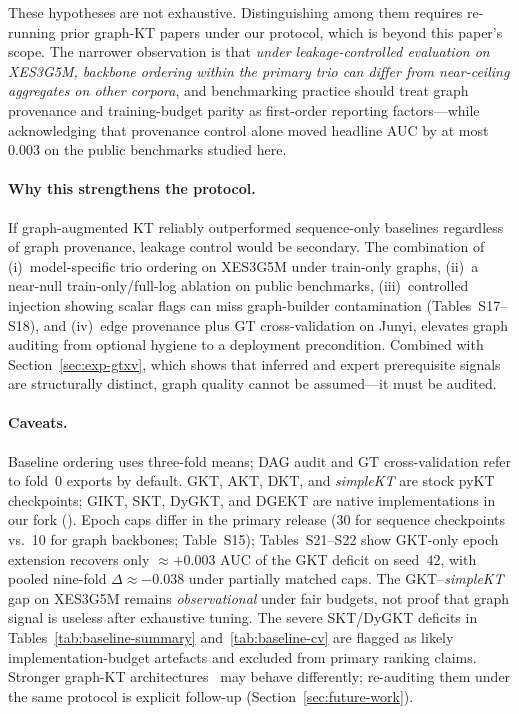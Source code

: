 \documentclass[pdflatex,sn-mathphys-num]{sn-jnl}
\newcommand{\GKTthirtydeltavec}{-0.038}
\newcommand{\GKTepochgain}{+0.003}
\begin{document}
These hypotheses are not exhaustive. Distinguishing among them requires
re-running prior graph-KT papers under our protocol, which is beyond this
paper's scope. The narrower observation is that \emph{under leakage-controlled
evaluation on XES3G5M, backbone ordering within the primary trio can differ
from near-ceiling aggregates on other corpora}, and benchmarking practice
should treat graph provenance and training-budget parity as first-order
reporting factors---while acknowledging that provenance control alone moved
headline AUC by at most $0.003$ on the public benchmarks studied here.

\paragraph{Why this strengthens the protocol.}
If graph-augmented KT reliably outperformed sequence-only baselines
regardless of graph provenance, leakage control would be secondary. The
combination of (i)~model-specific trio ordering on XES3G5M under train-only
graphs, (ii)~a near-null train-only/full-log ablation on public benchmarks,
(iii)~controlled injection showing scalar flags can miss graph-builder
contamination (Tables~S17--S18), and (iv)~edge provenance plus GT
cross-validation on Junyi, elevates graph auditing from optional hygiene to a
deployment precondition. Combined with Section~\ref{sec:exp-gtxv}, which shows
that inferred and expert prerequisite signals are structurally distinct, graph
quality cannot be assumed---it must be audited.

\paragraph{Caveats.}
Baseline ordering uses three-fold means; DAG audit and GT cross-validation
refer to fold~0 exports by default. GKT, AKT, DKT, and \textit{simpleKT} are
stock pyKT~\cite{liu2022pykt} checkpoints; GIKT, SKT, DyGKT, and DGEKT are
native implementations in our fork (). Epoch caps differ in
the primary release (30 for sequence checkpoints vs.\ 10 for graph backbones;
Table~S15); Tables~S21--S22 show GKT-only epoch extension recovers only
${\approx}\GKTepochgain{}$ AUC of the GKT deficit on seed~$42$, with pooled
nine-fold $\Delta{\approx}\GKTthirtydeltavec{}$ under partially matched caps.
The GKT--\textit{simpleKT} gap on XES3G5M remains \emph{observational} under
fair budgets, not proof that graph signal is useless after exhaustive tuning.
The severe SKT/DyGKT deficits in Tables~\ref{tab:baseline-summary}
and~\ref{tab:baseline-cv} are flagged as likely implementation-budget artefacts
and excluded from primary ranking claims. Stronger graph-KT architectures~\cite{tong2020skt,dygkt2024,dgekt2024}
may behave differently; re-auditing them under the same protocol is explicit
follow-up (Section~\ref{sec:future-work}).
\end{document}
